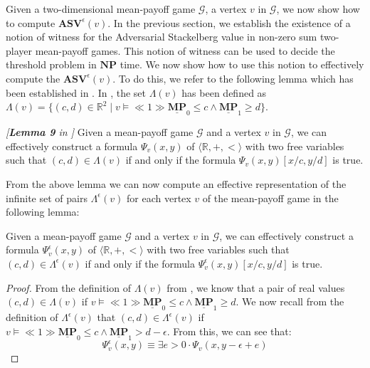 Given a two-dimensional mean-payoff game $\mathcal{G}$, a vertex $v$ in $\mathcal{G}$, we now show how to compute $\mathbf{ASV}^{\epsilon}(v)$.
In the previous section, we establish the existence of a notion of witness for the Adversarial Stackelberg value in non-zero sum two-player mean-payoff games. This notion of witness can be used to decide the threshold problem in $\mathbf{NP}$ time. We now show how to use this notion to effectively compute the $\mathbf{ASV}^{\epsilon}(v)$. To do this, we refer to the following lemma which has been established in \cite{FGR20}. 
In \cite{FGR20}, the set $\Lambda(v)$ has been defined as $\Lambda(v) = \{(c,d) \in \mathbb{R}^2 \mid v \models \ll 1 \gg \underline{\mathbf{MP}}_0 \leqslant c \land \underline{\mathbf{MP}}_1 \geqslant d \}$.

\begin{lemma}
\label{LemPsiToThrOfReal}
 \emph{[\textbf{Lemma 9} in \cite{FGR20}]}
 Given a mean-payoff game $\mathcal{G}$ and a vertex $v$ in $\mathcal{G}$, we can effectively construct a formula $\Psi_v(x, y)$ of $\langle \mathbb{R}, +, < \rangle$ with two free variables such that $(c,d) \in \Lambda(v)$ if and only if the formula $\Psi_v(x, y)[x/c, y/d]$ is true.
\end{lemma}

From the above lemma we can now compute an effective representation of the infinite set of pairs $\Lambda^{\epsilon}(v)$ for each vertex $v$ of the mean-payoff game in the following lemma:

\begin{lemma}
\label{LemPsiEpsToThrOfReal}
 Given a mean-payoff game $\mathcal{G}$ and a vertex $v$ in $\mathcal{G}$, we can effectively  construct a formula $\Psi_v^{\epsilon}(x, y)$ of $\langle \mathbb{R}, +, < \rangle$ with two free variables such that $(c,d) \in \Lambda^{\epsilon}(v)$ if and only if the formula $\Psi_v^{\epsilon}(x, y)[x/c, y/d]$ is true.
\end{lemma}
\begin{proof}
From the definition of $\Lambda(v)$ from \cite{FGR20}, we know that a pair of real values $(c,d) \in \Lambda(v)$ if $v \models \ll 1 \gg \underline{\mathbf{MP}}_0 \leqslant c \land \underline{\mathbf{MP}}_1 \geqslant d$.
We now recall from the definition of $\Lambda^{\epsilon}(v)$ that $(c,d) \in \Lambda^{\epsilon}(v)$ if $v \models \ll 1 \gg \underline{\mathbf{MP}}_0 \leqslant c \land \underline{\mathbf{MP}}_1 > d-\epsilon$.
From this, we can see that:
\begin{equation*}
    \Psi_v^{\epsilon}(x, y) \equiv \exists e > 0 \cdot \Psi_v(x, y - \epsilon + e)
\end{equation*}
\end{proof}

